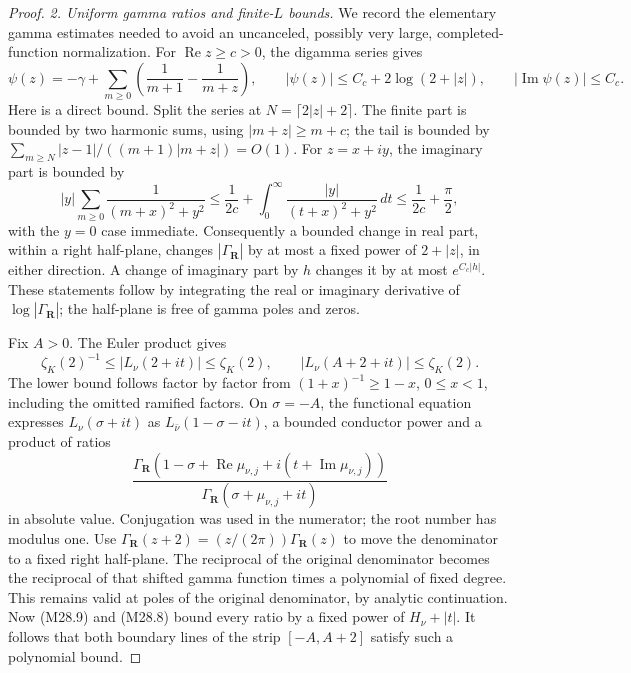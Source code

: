 \begin{proof}
\emph{2. Uniform gamma ratios and finite-\(L\) bounds.}
We record the elementary gamma estimates needed to avoid
an uncanceled, possibly very large, completed-function
normalization. For \(\operatorname{Re}z\ge c>0\), the
digamma series gives
\[
 \psi(z)=-\gamma+
      \sum_{m\ge0}\left(\frac1{m+1}-\frac1{m+z}\right),
 \qquad
 |\psi(z)|\le C_c+2\log(2+|z|),
 \qquad |\operatorname{Im}\psi(z)|\le C_c.                    \tag{M28.9}
\]
Here is a direct bound. Split the series at
\(N=\lceil2|z|+2\rceil\). The finite part is bounded by
two harmonic sums, using \(|m+z|\ge m+c\); the tail is
bounded by
\(\sum_{m\ge N}|z-1|/((m+1)|m+z|)=O(1)\).
For \(z=x+iy\), the imaginary part is bounded by
\[
 |y|\sum_{m\ge0}\frac1{(m+x)^2+y^2}
 \le \frac1{2c}+\int_0^\infty
           \frac{|y|}{(t+x)^2+y^2}\,dt
 \le \frac1{2c}+\frac\pi2,
 \]
with the \(y=0\) case immediate.
Consequently a bounded change in real part, within a
right half-plane, changes \(|\Gamma_{\mathbf R}|\) by
at most a fixed power of \(2+|z|\), in either direction.
A change of imaginary part by \(h\) changes it by at
most \(e^{C_c|h|}\). These statements follow by
integrating the real or imaginary derivative of
\(\log|\Gamma_{\mathbf R}|\); the half-plane is free
of gamma poles and zeros.

Fix \(A>0\). The Euler product gives
\[
 \zeta_K(2)^{-1}\le |L_\nu(2+it)|\le\zeta_K(2),
 \qquad |L_\nu(A+2+it)|\le\zeta_K(2).
                                                               \tag{M28.10}
\]
The lower bound follows factor by factor from
\((1+x)^{-1}\ge1-x\), \(0\le x<1\), including the
omitted ramified factors. On \(\sigma=-A\), the
functional equation expresses \(L_\nu(\sigma+it)\)
as \(L_{\bar\nu}(1-\sigma-it)\), a bounded conductor
power and a product of ratios
\[
  \frac{\Gamma_{\mathbf R}(1-\sigma+
                   \operatorname{Re}\mu_{\nu,j}
                   +i(t+\operatorname{Im}\mu_{\nu,j}))}
       {\Gamma_{\mathbf R}(\sigma+\mu_{\nu,j}+it)}
                                                               \tag{M28.11}
\]
in absolute value. Conjugation was used in the
numerator; the root number has modulus one.
Use
\(\Gamma_{\mathbf R}(z+2)=
 (z/(2\pi))\Gamma_{\mathbf R}(z)\)
to move the denominator to a fixed right half-plane.
The reciprocal of the original denominator becomes
the reciprocal of that shifted gamma function times
a polynomial of fixed degree. This remains valid
at poles of the original denominator, by analytic
continuation. Now (M28.9) and (M28.8) bound every
ratio by a fixed power of \(H_\nu+|t|\).
It follows that both boundary lines of the strip
\([-A,A+2]\) satisfy such a polynomial bound.


\end{proof}
